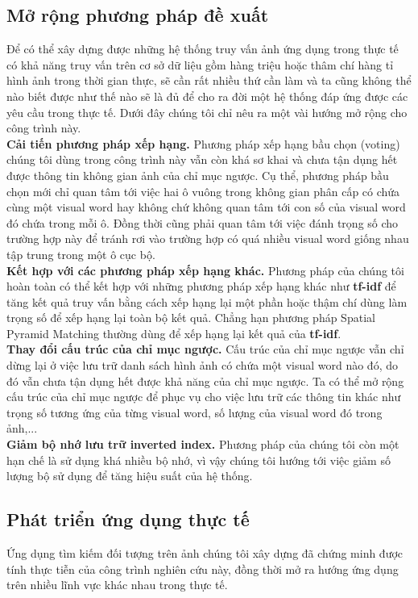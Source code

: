 \subsection{Mở rộng phương pháp đề xuất}
Để có thể xây dựng được những hệ thống truy vấn ảnh ứng dụng trong thực tế có khả năng truy vấn trên cơ sở dữ liệu gồm hàng triệu hoặc thâm chí hàng tỉ hình ảnh trong thời gian thực, sẽ cần rất nhiều thứ cần làm và ta cũng không thể nào biết được như thế nào sẽ là đủ để cho ra đời một hệ thống đáp ứng được các yêu cầu trong thực tế. Dưới đây chúng tôi chỉ nêu ra một vài hướng mở rộng cho công trình này.\\
\textbf{Cải tiến phương pháp xếp hạng.} Phương pháp xếp hạng bầu chọn (voting) chúng tôi dùng trong công trình này vẫn còn khá sơ khai và chưa tận dụng hết được thông tin không gian ảnh của chỉ mục ngược. Cụ thể, phương pháp bầu chọn mới chỉ quan tâm tới việc hai ô vuông trong không gian phân cấp có chứa cùng một visual word hay không chứ không quan tâm tới con số của visual word đó chứa trong mỗi ô. Đồng thời cũng phải quan tâm tới việc đánh trọng số cho trường hợp này để tránh rơi vào trường hợp có quá nhiều visual word giống nhau tập trung trong một ô cục bộ.\\
\textbf{Kết hợp với các phương pháp xếp hạng khác.} Phương pháp của chúng tôi hoàn toàn có thể kết hợp với những phương pháp xếp hạng khác như \textbf{tf-idf} để tăng kết quả truy vấn bằng cách xếp hạng lại một phần hoặc thậm chí dùng làm trọng số để xếp hạng lại toàn bộ kết quả. Chẳng hạn phương pháp Spatial Pyramid Matching thường dùng để xếp hạng lại kết quả của \textbf{tf-idf}.\\ 
\textbf{Thay đổi cấu trúc của chỉ mục ngược.} Cấu trúc của chỉ mục ngược vẫn chỉ dừng lại ở việc lưu trữ danh sách hình ảnh có chứa một visual word nào đó, do đó vẫn chưa tận dụng hết được khả năng của chỉ mục ngược. Ta có thể mở rộng cấu trúc của chỉ mục ngược để phục vụ cho việc lưu trữ các thông tin khác như trọng số tương ứng của từng visual word, số lượng của visual word đó trong ảnh,...\\
\textbf{Giảm bộ nhớ lưu trữ inverted index.} Phương pháp của chúng tôi còn một hạn chế là sử dụng khá nhiều bộ nhớ, vì vậy chúng tôi hướng tới việc giảm số lượng bộ sử dụng để tăng hiệu suất của hệ thống.

\subsection{Phát triển ứng dụng thực tế}
Ứng dụng tìm kiếm đối tượng trên ảnh chúng tôi xây dựng đã chứng minh được tính thực tiễn của công trình nghiên cứu này, đồng thời mở ra hướng ứng dụng trên nhiều lĩnh vực khác nhau trong thực tế.

